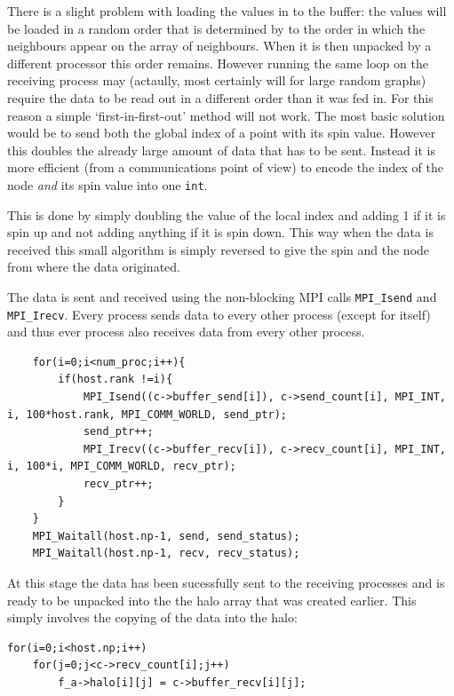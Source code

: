 \documentclass[pdftex,12pt,a4paper]{article}
\begin{document}
There is a slight problem with loading the values in to the buffer: the values will be loaded in a random order that is determined by to the order in which the neighbours appear on the array of neighbours. When it is then unpacked by a different processor this order remains. However running the same loop on the receiving process may (actaully, most certainly will for large random graphs) require the data to be read out in a different order than it was fed in. For this reason a simple `first-in-first-out' method will not work. The most basic solution would be to send both the global index of a point with its spin value. However this doubles the already large amount of data that has to be sent. Instead it is more efficient (from a communications point of view) to encode the index of the node \emph{and} its spin value into one \verb|int|.

This is done by simply doubling the value of the local index and adding 1 if it is spin up and not adding anything if it is spin down. This way when the data is received this small algorithm is simply reversed to give the spin and the node from where the data originated.

The data is sent and received using the non-blocking MPI calls \verb|MPI_Isend| and \verb|MPI_Irecv|. Every process sends data to every other process (except for itself) and thus ever process also receives data from every other process.
\newpage
\begin{lstlisting}
	for(i=0;i<num_proc;i++){
		if(host.rank !=i){
			MPI_Isend((c->buffer_send[i]), c->send_count[i], MPI_INT, i, 100*host.rank, MPI_COMM_WORLD, send_ptr);
			send_ptr++;
			MPI_Irecv((c->buffer_recv[i]), c->recv_count[i], MPI_INT, i, 100*i, MPI_COMM_WORLD, recv_ptr);
			recv_ptr++;
		}
	}
	MPI_Waitall(host.np-1, send, send_status);
	MPI_Waitall(host.np-1, recv, recv_status);
\end{lstlisting}

At this stage the data has been sucessfully sent to the receiving processes and is ready to be unpacked into the the halo array that was created earlier. This simply involves the copying of the data into the halo:

\begin{lstlisting}
for(i=0;i<host.np;i++)
	for(j=0;j<c->recv_count[i];j++)
		f_a->halo[i][j] = c->buffer_recv[i][j];
\end{lstlisting}
\end{document}
